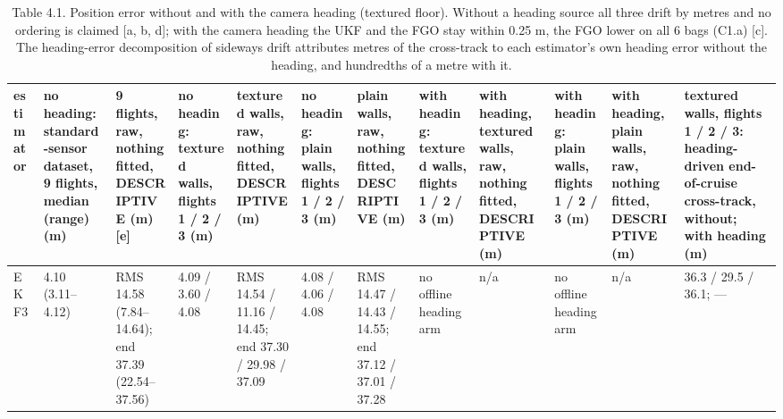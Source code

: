 \begin{table}[htbp]
\centering
\footnotesize
\caption{Table 4.1. Position error without and with the camera heading (textured floor). Without a heading source all three drift by metres and no ordering is claimed [a, b, d]; with the camera heading the UKF and the FGO stay within 0.25 m, the FGO lower on all 6 bags (C1.a) [c]. The heading-error decomposition of sideways drift attributes metres of the cross-track to each estimator's own heading error without the heading, and hundredths of a metre with it.}
\label{tab:4-1}
\begin{tabular}{p{}p{}p{}p{}p{}p{}p{}p{}p{}p{}p{}p{}}
\toprule
\textbf{estimator} & \textbf{no heading: standard-sensor dataset, 9 flights, median (range) (m)} & \textbf{9 flights, raw, nothing fitted, DESCRIPTIVE (m) [e]} & \textbf{no heading: textured walls, flights 1 / 2 / 3 (m)} & \textbf{textured walls, raw, nothing fitted, DESCRIPTIVE (m)} & \textbf{no heading: plain walls, flights 1 / 2 / 3 (m)} & \textbf{plain walls, raw, nothing fitted, DESCRIPTIVE (m)} & \textbf{with heading: textured walls, flights 1 / 2 / 3 (m)} & \textbf{with heading, textured walls, raw, nothing fitted, DESCRIPTIVE (m)} & \textbf{with heading: plain walls, flights 1 / 2 / 3 (m)} & \textbf{with heading, plain walls, raw, nothing fitted, DESCRIPTIVE (m)} & \textbf{textured walls, flights 1 / 2 / 3: heading-driven end-of-cruise cross-track, without; with heading (m)} \\
\midrule
EKF3 & 4.10 (3.11--4.12) & RMS 14.58 (7.84--14.64); end 37.39 (22.54--37.56) & 4.09 / 3.60 / 4.08 & RMS 14.54 / 11.16 / 14.45; end 37.30 / 29.98 / 37.09 & 4.08 / 4.06 / 4.08 & RMS 14.47 / 14.43 / 14.55; end 37.12 / 37.01 / 37.28 & no offline heading arm & n/a & no offline heading arm & n/a & 36.3 / 29.5 / 36.1; --- \\

\end{tabular}
\end{table}
